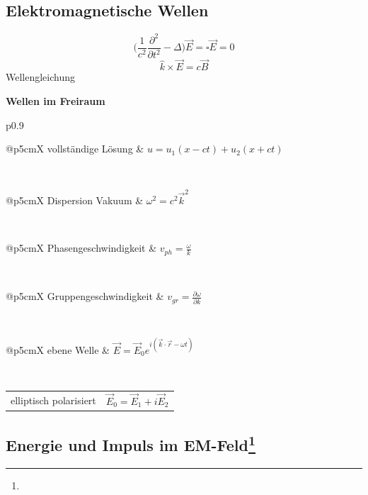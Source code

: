 \documentclass[12pt,a4paper, twoside]{article}
\makeatletter
\newcommand{\pd}[2]{\frac{\partial #1}{\partial #2}}
\newcommand{\pdd}[2]{\frac{\partial^2 #1}{\partial #2^2}}
\renewcommand{\=}[1]{\stackrel{#1}{=}}
\newcommand{\ort}{\vec r}
\theoremstyle{definition}
\theoremstyle{remark}
\newcommand{\concept}[2]{%
\noindent
\begin{framed}
\noindent\textbf{#1}
\par\begin{tabular}{p{0.9\linewidth}}
#2
\end{tabular}
\end{framed}
}
\newcommand{\f}[2]{%
\noindent\begin{tabularx}{\linewidth}{@{}p{5cm}X}
#1 & $#2$
\end{tabularx}}
\makeatother
\begin{document}
\subsection{Elektromagnetische Wellen}

\begin{center}
\begin{framed}
$$\Big(\frac{1}{c^2} \pdd{}{t} - \Delta\Big) \vec E = \square \vec E = 0$$
$$\hat k \times \vec E = c \vec B$$
\centering Wellengleichung
\end{framed}
\end{center}

\concept{Wellen im Freiraum}{
\f{vollständige Lösung}{u = u_1 (x-ct) + u_2 (x+ct)}\\
\f{Dispersion Vakuum}{\omega^2 = c^2 \vec k^2}\\
\f{Phasengeschwindigkeit}{v_{ph} = \frac{\omega}{k}}\\
\f{Gruppengeschwindigkeit}{v_{gr} = \pd{\omega}{k}}\\
\f{ebene Welle}{\vec E = \vec E_0 e^{i(\vec k \cdot \ort - \omega t)}}\\
\f{elliptisch polarisiert}{\vec E_0 = \vec E_1 + i \vec E_2}
}



\subsection[Energie und Impuls im EM-Feld]{Energie und Impuls im EM-Feld\let\thefootnote\relax\footnote{}}
\end{document}
